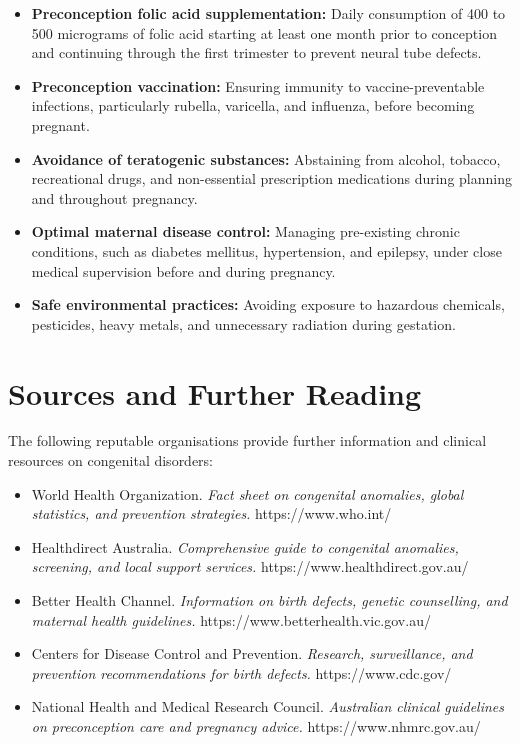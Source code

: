 \begin{itemize}
    \item \textbf{Preconception folic acid supplementation:} Daily consumption of 400 to 500 micrograms of folic acid starting at least one month prior to conception and continuing through the first trimester to prevent neural tube defects.
    \item \textbf{Preconception vaccination:} Ensuring immunity to vaccine-preventable infections, particularly rubella, varicella, and influenza, before becoming pregnant.
    \item \textbf{Avoidance of teratogenic substances:} Abstaining from alcohol, tobacco, recreational drugs, and non-essential prescription medications during planning and throughout pregnancy.
    \item \textbf{Optimal maternal disease control:} Managing pre-existing chronic conditions, such as diabetes mellitus, hypertension, and epilepsy, under close medical supervision before and during pregnancy.
    \item \textbf{Safe environmental practices:} Avoiding exposure to hazardous chemicals, pesticides, heavy metals, and unnecessary radiation during gestation.
\end{itemize}

\section*{Sources and Further Reading}
The following reputable organisations provide further information and clinical resources on congenital disorders:

\begin{itemize}
    \item World Health Organization. \textit{Fact sheet on congenital anomalies, global statistics, and prevention strategies.} https://www.who.int/
    \item Healthdirect Australia. \textit{Comprehensive guide to congenital anomalies, screening, and local support services.} https://www.healthdirect.gov.au/
    \item Better Health Channel. \textit{Information on birth defects, genetic counselling, and maternal health guidelines.} https://www.betterhealth.vic.gov.au/
    \item Centers for Disease Control and Prevention. \textit{Research, surveillance, and prevention recommendations for birth defects.} https://www.cdc.gov/
    \item National Health and Medical Research Council. \textit{Australian clinical guidelines on preconception care and pregnancy advice.} https://www.nhmrc.gov.au/
\end{itemize}

